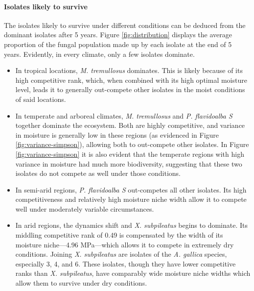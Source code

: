 \documentclass[12pt]{article}
\begin{document}
\paragraph{Isolates likely to survive}
The isolates likely to survive under different conditions can be deduced from the dominant isolates after 5 years. Figure \ref{fig:distribution} displays the average proportion of the fungal population made up by each isolate at the end of 5 years. Evidently, in every climate, only a few isolates dominate. 
\begin{itemize}
    \item In tropical locations, \emph{M. tremullosus} dominates. This is likely because of its high competitive rank, which, when combined with its high optimal moisture level, leads it to generally out-compete other isolates in the moist conditions of said locations. 
    \item In temperate and arboreal climates, \emph{M. tremullosus} and \emph{P. flavidoalba S} together dominate the ecosystem. Both are highly competitive, and variance in moisture is generally low in these regions (as evidenced in Figure \ref{fig:variance-simpson}), allowing both to out-compete other isolates. In Figure \ref{fig:variance-simpson} it is also evident that the temperate regions with high variance in moisture had much more biodiversity, suggesting that these two isolates do not compete as well under those conditions.
    \item In semi-arid regions, \emph{P. flavidoalba S} out-competes all other isolates. Its high competitiveness and relatively high moisture niche width allow it to compete well under moderately variable circumstances.
    \item In arid regions, the dynamics shift and \emph{X. subpileatus} begins to dominate. Its middling competitive rank of 0.49 is compensated by the width of its moisture niche---4.96 MPa---which allows it to compete in extremely dry conditions. Joining \emph{X. subpileatus} are isolates of the \emph{A. gallica} species, especially 3, 4, and 6. These isolates, though they have lower competitive ranks than \emph{X. subpileatus}, have comparably wide moisture niche widths which allow them to survive under dry conditions.
\end{itemize}





\end{document}
